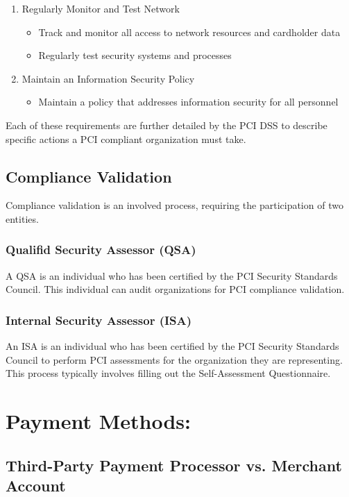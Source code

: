 \documentclass[letterpaper]{article}
\begin{document}
\begin{enumerate}
\begin{itemize}
          \end{itemize}
        \item Regularly Monitor and Test Network
          \begin{itemize}
            \item Track and monitor all access to network resources and cardholder data
            \item Regularly test security systems and processes
          \end{itemize}
        \item Maintain an Information Security Policy
          \begin{itemize}
            \item  Maintain a policy that addresses information security for all personnel
          \end{itemize}
      \end{enumerate}
    Each of these requirements are further detailed by the PCI DSS to describe specific actions a PCI compliant organization must take.
  \subsection{Compliance Validation}
    Compliance validation is an involved process, requiring the participation of two entities.
    \subsubsection{Qualifid Security Assessor (QSA)}
      A QSA is an individual who has been certified by the PCI Security Standards Council.
      This individual can audit organizations for PCI compliance validation.
    \subsubsection{Internal Security Assessor (ISA)}
      An ISA is an individual who has been certified by the PCI Security Standards Council to perform
      PCI assessments for the organization they are representing. This process typically involves filling out
      the Self-Assessment Questionnaire.
  \section{Payment Methods:}
    \subsection{Third-Party Payment Processor vs. Merchant Account}
\end{document}
